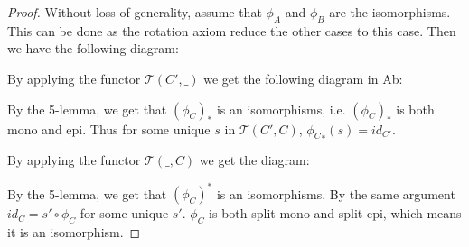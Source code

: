 \documentclass[12pt]{article}
\theoremstyle{definition}
\theoremstyle{remark}
\begin{document}
            \begin{proof}
                Without loss of generality, assume that $\phi_A$ and $\phi_B$ are the isomorphisms. This can be done as the rotation axiom reduce the other cases to this case. Then we have the following diagram:
                \begin{center}
                \end{center}
                By applying the functor $\mathcal{T}(C',\_)$ we get the following diagram in Ab:
                \begin{center}
                \end{center}
                By the 5-lemma, we get that $(\phi_C)_*$ is an isomorphisms, i.e. $(\phi_C)_*$ is both mono and epi. Thus for some unique $s$ in $\mathcal{T}(C',C)$, ${\phi_C}_*(s)=id_{C'}$. 

                By applying the functor $\mathcal{T}(\_,C)$ we get the diagram:
                \begin{center}
                \end{center}
                By the 5-lemma, we get that $(\phi_C)^*$ is an isomorphisms. By the same argument $id_{C} = s'\circ\phi_C$ for some unique $s'$. $\phi_C$ is both split mono and split epi, which means it is an isomorphism.
            \end{proof}
\end{document}
